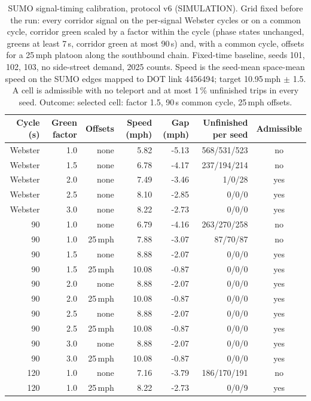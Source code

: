 \begin{table}[t]\centering\caption{SUMO signal-timing calibration, protocol v6 (SIMULATION). Grid fixed before the run: every corridor signal on the per-signal Webster cycles or on a common cycle, corridor green scaled by a factor within the cycle (phase states unchanged, greens at least 7\,s, corridor green at most 90\,s) and, with a common cycle, offsets for a 25\,mph platoon along the southbound chain. Fixed-time baseline, seeds 101, 102, 103, no side-street demand, 2025 counts. Speed is the seed-mean space-mean speed on the SUMO edges mapped to DOT link 4456494; target 10.95\,mph $\pm$ 1.5. A cell is admissible with no teleport and at most 1\,\% unfinished trips in every seed. Outcome: selected cell: factor 1.5, 90\,s common cycle, 25\,mph offsets.}\label{tab:splitcal6}\small
\begin{tabular}{rrrrrrc}\toprule Cycle (s) & Green factor & Offsets & Speed (mph) & Gap (mph) & Unfinished per seed & Admissible \\ \midrule
Webster & 1.0 & none & 5.82 & -5.13 & 568/531/523 & no \\
Webster & 1.5 & none & 6.78 & -4.17 & 237/194/214 & no \\
Webster & 2.0 & none & 7.49 & -3.46 & 1/0/28 & yes \\
Webster & 2.5 & none & 8.10 & -2.85 & 0/0/0 & yes \\
Webster & 3.0 & none & 8.22 & -2.73 & 0/0/0 & yes \\
90 & 1.0 & none & 6.79 & -4.16 & 263/270/258 & no \\
90 & 1.0 & 25\,mph & 7.88 & -3.07 & 87/70/87 & no \\
90 & 1.5 & none & 8.88 & -2.07 & 0/0/0 & yes \\
90 & 1.5 & 25\,mph & 10.08 & -0.87 & 0/0/0 & yes \\
90 & 2.0 & none & 8.88 & -2.07 & 0/0/0 & yes \\
90 & 2.0 & 25\,mph & 10.08 & -0.87 & 0/0/0 & yes \\
90 & 2.5 & none & 8.88 & -2.07 & 0/0/0 & yes \\
90 & 2.5 & 25\,mph & 10.08 & -0.87 & 0/0/0 & yes \\
90 & 3.0 & none & 8.88 & -2.07 & 0/0/0 & yes \\
90 & 3.0 & 25\,mph & 10.08 & -0.87 & 0/0/0 & yes \\
120 & 1.0 & none & 7.16 & -3.79 & 186/170/191 & no \\
120 & 1.0 & 25\,mph & 8.22 & -2.73 & 0/0/9 & yes \\

\end{tabular}
\end{table}
